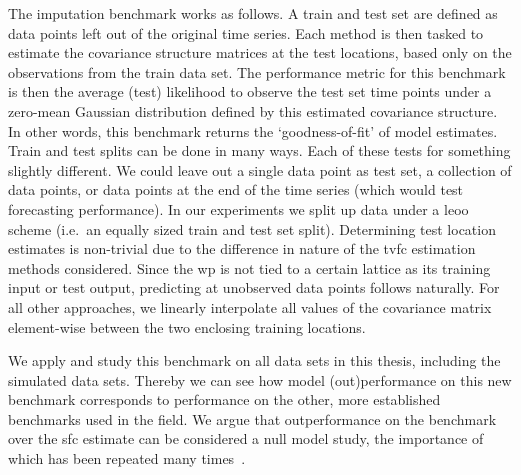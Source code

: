 The imputation benchmark works as follows.
A train and test set are defined as data points left out of the original time series.
%
Each method is then tasked to estimate the covariance structure matrices at the test locations, based only on the observations from the train data set.
The performance metric for this benchmark is then the average (test) likelihood to observe the test set time points under a zero-mean Gaussian distribution defined by this estimated covariance structure.
In other words, this benchmark returns the `goodness-of-fit' of model estimates.
%
Train and test splits can be done in many ways.
Each of these tests for something slightly different.
We could leave out a single data point as test set, a collection of data points, or data points at the end of the time series (which would test forecasting performance).
%
In our experiments we split up data under a \gls{leoo} scheme (i.e.~an equally sized train and test set split).
%
Determining test location estimates is non-trivial due to the difference in nature of the \gls{tvfc} estimation methods considered.
Since the \gls{wp} is not tied to a certain lattice as its training input or test output, predicting at unobserved data points follows naturally.
For all other approaches, we linearly interpolate all values of the covariance matrix element-wise between the two enclosing training locations.

We apply and study this benchmark on all data sets in this thesis, including the simulated data sets.
Thereby we can see how model (out)performance on this new benchmark corresponds to performance on the other, more established benchmarks used in the field.
%
We argue that outperformance on the benchmark over the \gls{sfc} estimate can be considered a null model study, the importance of which has been repeated many times~\parencite[see e.g.][]{Miller2018, Liegeois2021, Novelli2022}.
